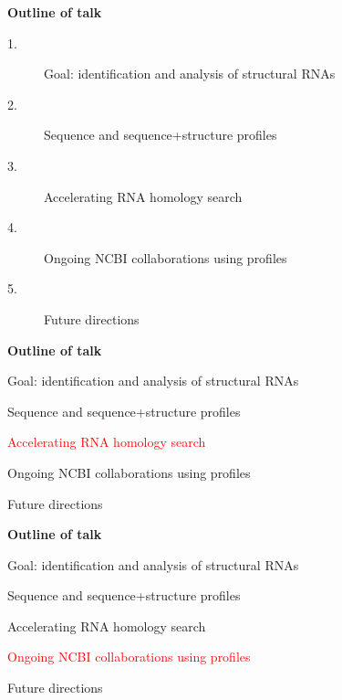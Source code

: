 \documentclass[landscape]{slides}
\begin{document}


\begin{slide}
\begin{center}
\textbf{Outline of talk}

\small
\begin{description}
\item[1.] Goal: identification and analysis of structural RNAs
\item[2.] Sequence and sequence+structure profiles
\item[3.] Accelerating RNA homology search%
\item[4.] Ongoing NCBI collaborations using profiles
\item[5.] Future directions
\end{description}

\end{center}
\vfill
\end{slide}


%

%

\begin{slide}
\begin{center}
\textbf{Outline of talk}

\small
\begin{description}
\item[1.] Goal: identification and analysis of structural RNAs
\item[2.] Sequence and sequence+structure profiles
\textcolor{red}{\item[3.] Accelerating RNA homology search}
\item[4.] Ongoing NCBI collaborations using profiles
\item[5.] Future directions
\end{description}

\end{center}
\vfill
\end{slide}


\begin{slide}
\begin{center}
\textbf{Outline of talk}

\small
\begin{description}
\item[1.] Goal: identification and analysis of structural RNAs
\item[2.] Sequence and sequence+structure profiles
\item[3.] Accelerating RNA homology search
\textcolor{red}{\item[4.] Ongoing NCBI collaborations using profiles}
\item[5.] Future directions
\end{description}

\end{center}
\vfill
\end{slide}
\end{document}
